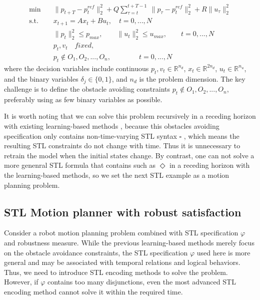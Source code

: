 \documentclass[a4paper]{report}
\begin{document}
\begin{equation}
    \label{eq3}%
    \begin{aligned}
        \min \quad       &  \| p_{t+T}-p_{t}^{ref} \|_{2}^{2} +  Q\sum_{\tau=t}^{t+T-1}\  \| p_{\tau}-p_{t}^{ref} \|_2^2 + R \|u_{\tau}\|_{2}^2 \\
        \text{s.t.}\quad &
        x_{t+1}=Ax_{t}+Bu_{t},  \quad t=0,...,N                                                                          \\
                         & \|p_t\|_2^{2} \leq p_{max}, \qquad
                         \|u_t\|_2^{2} \leq u_{max}, \qquad  t=0,...,N                                                            \\
                         & p_t, v_t \quad  fixed,                                   \\
                         & p_t \notin O_1,O_2,...,O_n, \qquad\qquad t=0,...,N
    \end{aligned}
\end{equation}
where the decision variables include continuous $p_t, v_t \in \mathbb{R}^{n_d}$, $x_t \in \mathbb{R}^{2n_d}$, $u_t \in \mathbb{R}^{n_u}$, and the binary variables $\delta_j \in \{0,1\}$, and $n_d$ is the problem dimension. The key challenge is to define the obstacle avoiding constraints $p_t \notin O_1,O_2,...,O_n$, preferably using as few binary variables as possible. 

It is worth noting that we can solve this problem recursively in a receding horizon with existing learning-based methods \cite[]{bertsimas2022online}\cite[]{Cauligi2020}\cite[]{bertsimas2021voice}, because this obstacles avoiding specification only contains non-time-varying STL syntax $\square$ , which means the resulting STL constraints do not change with time. Thus it is unnecessary to retrain the model when the initial states change. By contrast, one can not solve a more genenral STL formula that contains such as $\Diamond$ in a receding horizon with the learning-based methods, so we set the next STL example as a motion planning problem.

\subsection{STL Motion planner with robust satisfaction} 
\label{STL_motion_planner}
Consider a robot motion planning problem combined with STL specification $\varphi$ and robustness measure. While the previous learning-based methods merely focus on the obstacle avoidance constraints, the STL specification $\varphi$ used here is more general and may be associated with temporal relations and logical behaviors. Thus, we need to introduce STL encoding methods to solve the problem. However, if $\varphi$ contains too many disjunctions, even the most advanced STL encoding method \cite{kurtz2022mixed} cannot solve it within the required time.
\end{document}
